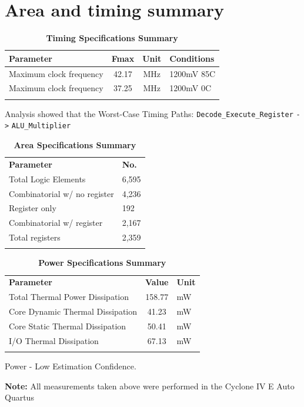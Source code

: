 \documentclass[10pt]{datasheet}
\begin{document}
\smallbreak



\onecolumn

\section{Area and timing summary}
\smallbreak

\begin{table}[h]
\caption{\textbf{Timing Specifications Summary } }
\begin{tabularx}{\textwidth}{l | c | c |  X}
    \thickhline
    \textbf{Parameter} &  \textbf{Fmax} & \textbf{Unit} & \textbf{Conditions} \\
    \hline
    Maximum clock frequency  & 42.17 & MHz & 1200mV 85C \\
     \hline
    Maximum clock frequency  & 37.25 & MHz & 1200mV 0C \\
    \thickhline
\end{tabularx}
\end{table}

Analysis showed that the Worst-Case Timing Paths: \verb|Decode_Execute_Register| \verb|->| \verb|ALU_Multiplier|

\begin{table}[h]
\caption{\textbf{Area Specifications Summary } }
\begin{tabularx}{\textwidth}{l | X}
    \thickhline
    \textbf{Parameter} &  \textbf{No.} \\
    \thickhline
    Total Logic Elements &  6,595\\
    \hline
    Combinatorial w/ no register  & 4,236  \\
     \hline
    Register only & 192  \\
    \hline
    Combinatorial w/ register & 2,167 \\
    \hline
    Total registers & 2,359 \\
    \thickhline
\end{tabularx}
\end{table}

\begin{table}[h]
\caption{\textbf{Power Specifications Summary } }
\begin{tabularx}{\textwidth}{l | c | X}
    \thickhline
    \textbf{Parameter} & \textbf{Value} &  \textbf{Unit} \\
    \thickhline
    Total Thermal Power Dissipation & 158.77 & mW\\
    \hline
     Core Dynamic Thermal Dissipation  & 41.23 & mW  \\
     \hline
    Core Static Thermal Dissipation & 50.41 & mW  \\
    \hline
    I/O Thermal Dissipation & 67.13 & mW  \\
    \thickhline
\end{tabularx}
\end{table}
Power - Low Estimation Confidence.

\textbf{Note:} All measurements taken above were performed in the Cyclone IV E Auto Quartus
\end{document}
